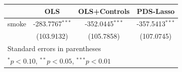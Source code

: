 {

\begin{tabular}{l*{3}{c}}
\toprule
                &\multicolumn{1}{c}{OLS}&\multicolumn{1}{c}{OLS+Controls}&\multicolumn{1}{c}{PDS-Lasso}\\
\midrule
smoke           &-283.7767$^{***}$&-352.0445$^{***}$&-357.5413$^{***}$\\
                &(103.9132)         &(105.7858)         &(107.0745)         \\
\bottomrule
\multicolumn{4}{l}{\footnotesize Standard errors in parentheses}\\
\multicolumn{4}{l}{\footnotesize $^{*}p<0.10$, $^{**}p<0.05$, $^{***}p<0.01$}\\
\end{tabular}
}
